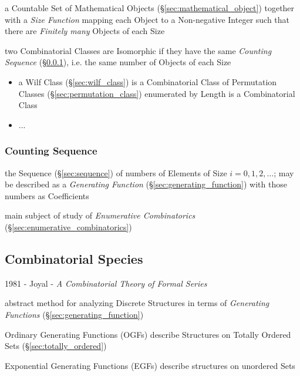 a Countable Set of Mathematical Objects (\S\ref{sec:mathematical_object})
together with a \emph{Size Function} mapping each Object to a Non-negative
Integer such that there are \emph{Finitely many} Objects of each Size

two Combinatorial Classes are Isomorphic if they have the same \emph{Counting
  Sequence} (\S\ref{sec:counting_sequence}), i.e. the same number of Objects of
each Size

\begin{itemize}
  \item a Wilf Class (\S\ref{sec:wilf_class}) is a Combinatorial Class of
    Permutation Classes (\S\ref{sec:permutation_class}) enumerated by Length is
    a Combinatorial Class
  \item ...
\end{itemize}



\subsubsection{Counting Sequence}\label{sec:counting_sequence}

the Sequence (\S\ref{sec:sequence}) of numbers of Elements of Size $i = 0, 1, 2,
\ldots$; may be described as a \emph{Generating Function}
(\S\ref{sec:generating_function}) with those numbers as Coefficients

main subject of study of \emph{Enumerative Combinatorics}
(\S\ref{sec:enumerative_combinatorics})



\subsection{Combinatorial Species}\label{sec:combinatorial_species}

1981 - Joyal - \emph{A Combinatorial Theory of Formal Series}

abstract method for analyzing Discrete Structures in terms of \emph{Generating
  Functions} (\S\ref{sec:generating_function})

Ordinary Generating Functions (OGFs) describe Structures on Totally Ordered Sets
(\S\ref{sec:totally_ordered})

Exponential Generating Functions (EGFs) describe structures on unordered Sets

